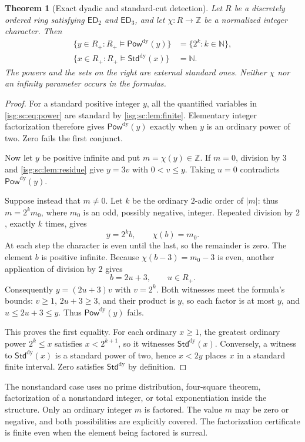 \documentclass[11pt]{article}
\newtheorem{theorem}{Theorem}[section]
\theoremstyle{definition}
\theoremstyle{remark}
\newcommand{\Z}{\mathbb{Z}}
\newcommand{\N}{\mathbb{N}}
\newcommand{\PowDy}{\mathsf{Pow}^{\mathrm{dy}}}
\newcommand{\StdDy}{\mathsf{Std}^{\mathrm{dy}}}
\newcommand{\ED}{\mathsf{ED}}
\begin{document}
\begin{theorem}[Exact dyadic and standard-cut detection]\label{isg:sc:thm:dyadic}
Let $R$ be a discretely ordered ring satisfying $\ED_2$ and $\ED_3$, and
let $\chi:R\to\Z$ be a normalized integer character. Then
\begin{align*}
 \{y\in R_+:R_+\models\PowDy(y)\}&=\{2^k:k\in\N\},\\
 \{x\in R_+:R_+\models\StdDy(x)\}&=\N.
\end{align*}
The powers and the sets on the right are external standard ones. Neither
$\chi$ nor an infinity parameter occurs in the formulas.
\end{theorem}
\begin{proof}
For a standard positive integer $y$, all the quantified variables in
\eqref{isg:sc:eq:power} are standard by \cref{isg:sc:lem:finite}.
Elementary integer factorization therefore gives $\PowDy(y)$ exactly when
$y$ is an ordinary power of two. Zero fails the first conjunct.

Now let $y$ be positive infinite and put $m=\chi(y)\in\Z$. If $m=0$,
division by $3$ and \cref{isg:sc:lem:residue} give $y=3v$ with
$0<v\le y$. Taking $u=0$ contradicts $\PowDy(y)$.

Suppose instead that $m\ne0$. Let $k$ be the ordinary $2$-adic order of
$|m|$: thus $m=2^km_0$, where $m_0$ is an odd, possibly negative,
integer. Repeated division by $2$, exactly $k$ times, gives
\[
 y=2^kb,\qquad \chi(b)=m_0.
\]
At each step the character is even until the last, so the remainder is
zero. The element $b$ is positive infinite. Because $\chi(b-3)=m_0-3$ is
even, another application of division by $2$ gives
\[
 b=2u+3,\qquad u\in R_+.
\]
Consequently $y=(2u+3)v$ with $v=2^k$. Both witnesses meet the formula's
bounds: $v\ge1$, $2u+3\ge3$, and their product is $y$, so each factor is
at most $y$, and $u\le2u+3\le y$. Thus $\PowDy(y)$ fails.

This proves the first equality. For each ordinary $x\ge1$, the greatest
ordinary power $2^k\le x$ satisfies $x<2^{k+1}$, so it witnesses
$\StdDy(x)$. Conversely, a witness to $\StdDy(x)$ is a standard power of
two, hence $x<2y$ places $x$ in a standard finite interval. Zero
satisfies $\StdDy$ by definition.
\end{proof}

\begin{remark}\label{isg:sc:rem:small}
The nonstandard case uses no prime distribution, four-square theorem,
factorization of a nonstandard integer, or total exponentiation inside the
structure. Only an ordinary integer $m$ is factored. The value $m$ may be
zero or negative, and both possibilities are explicitly covered. The
factorization certificate is finite even when the element being factored
is surreal.
\end{remark}
\end{document}
